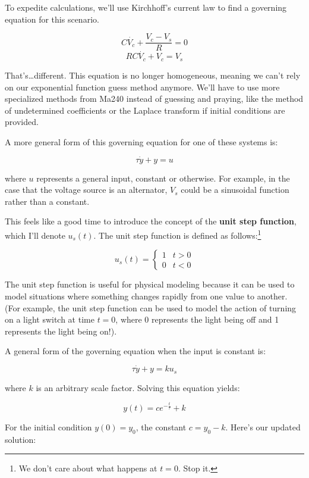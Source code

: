 \documentclass[
  letterpaper,
  DIV=11,
  numbers=noendperiod]{scrreprt}
\begin{document}
To expedite calculations, we'll use Kirchhoff's current law to find a
governing equation for this scenario.

\[ C \dot{V_c} + \frac{V_c - V_s}{R} = 0 \]
\[ RC \dot{V_c} + V_c = V_s \]

That's\ldots different. This equation is no longer homogeneous, meaning
we can't rely on our exponential function guess method anymore. We'll
have to use more specialized methods from Ma240 instead of guessing and
praying, like the method of undetermined coefficients or the Laplace
transform if initial conditions are provided.

A more general form of this governing equation for one of these systems
is:

\[\tau \dot{y} + y = u\]

where \(u\) represents a general input, constant or otherwise. For
example, in the case that the voltage source is an alternator, \(V_s\)
could be a sinusoidal function rather than a constant.

This feels like a good time to introduce the concept of the \textbf{unit
step function}, which I'll denote \(u_s(t)\). The unit step function is
defined as follows:\footnote{We don't care about what happens at
  \(t=0\). Stop it.}

\begin{equation*}
        u_s(t) = \begin{cases}
                        1 &t>0 \\
                        0 &t<0
                    \end{cases}
\end{equation*}

The unit step function is useful for physical modeling because it can be
used to model situations where something changes rapidly from one value
to another. (For example, the unit step function can be used to model
the action of turning on a light switch at time \(t=0\), where 0
represents the light being off and 1 represents the light being on!).

A general form of the governing equation when the input is constant is:

\[\tau \dot{y} + y = ku_s\]

where \(k\) is an arbitrary scale factor. Solving this equation yields:

\[y(t) = ce^{-\frac{t}{\tau}} + k\]

For the initial condition \(y(0) = y_0\), the constant \(c=y_0 - k\).
Here's our updated solution:
\end{document}
